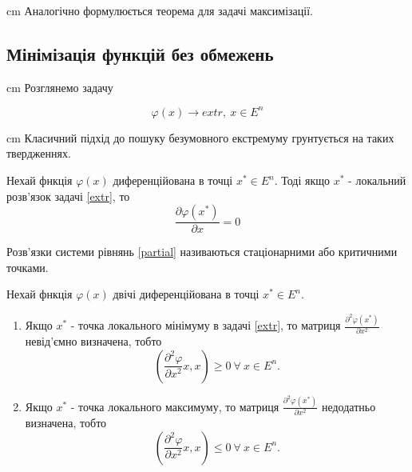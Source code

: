 \documentclass[12pt,a4paper]{article}
\begin{document}
\begin{flushleft}
\parbox{14,5 cm}{ cm Аналогічно формулюється теорема для задачі максимізації.}
\end{flushleft}
\begin{center}
\subsection*{Мінімізація функцій без обмежень}
\end{center}
\begin{flushleft}
\parbox{14,5 cm}{ cm Розглянемо задачу}
\end{flushleft}
\begin{equation}\label{extr}
\varphi\left(x\right)\rightarrow extr,\ x\in {E}^n
\end{equation}
\begin{flushleft}
\parbox{14,5 cm}{ cm Класичний підхід до пошуку безумовного екстремуму грунтується на таких твердженнях.}
\end{flushleft}
\begin{theorem1}
Нехай фнкція $\varphi\left(x\right)$ диференційована в точці ${x}^*\in {E}^n$. Тоді якщо ${x}^*$ - локальний розв'язок задачі \eqref{extr}, то 
\begin{equation}\label{partial}
\frac{\partial\varphi\left({x}^*\right)}{\partial x}=0
\end{equation}
\end{theorem1}
\begin{law5}
Розв'язки системи рівнянь \eqref{partial} називаються стаціонарними або критичними точками.
\end{law5}
\begin{theorem2}
Нехай фнкція $\varphi\left(x\right)$ двічі диференційована в точці ${x}^*\in {E}^n$. 
\begin{enumerate}
\item Якщо ${x}^*$ - точка локального мінімуму в задачі \eqref{extr}, то матриця $\frac{{\partial}^2\varphi\left({x}^*\right)}{\partial {x}^2}$ невід'ємно визначена, тобто $$\left(\frac{{\partial}^2\varphi}{\partial {x}^2} x, x\right)\ge 0\ \forall\ x\in {E}^n.$$
\item Якщо ${x}^*$ - точка локального максимуму, то матриця $\frac{{\partial}^2\varphi\left({x}^*\right)}{\partial {x}^2}$ недодатньо визначена, тобто $$\left(\frac{{\partial}^2\varphi}{\partial {x}^2} x, x\right)\le 0\ \forall\ x\in {E}^n.$$
\end{enumerate} 
\end{theorem2}
\end{document}
